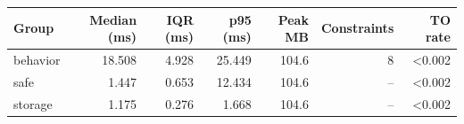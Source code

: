 \begin{tabular}{lrrrrrr}
\toprule
Group & Median (ms) & IQR (ms) & p95 (ms) & Peak MB & Constraints & TO rate \\
\midrule
behavior & 18.508 & 4.928 & 25.449 & 104.6 & 8 & <0.002 \\
safe & 1.447 & 0.653 & 12.434 & 104.6 & -- & <0.002 \\
storage & 1.175 & 0.276 & 1.668 & 104.6 & -- & <0.002 \\
\bottomrule
\end{tabular}
